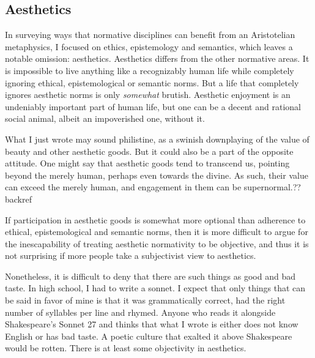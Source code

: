 \subsection{Aesthetics}
In surveying ways that normative disciplines can benefit from an Aristotelian metaphysics, I focused on 
ethics, epistemology  and semantics, which leaves a notable omission: aesthetics. Aesthetics differs from
the other normative areas. It is impossible to live anything like a recognizably human 
life while completely ignoring ethical, epistemological or semantic norms. But a life that completely ignores 
aesthetic norms is only \textit{somewhat} brutish. Aesthetic enjoyment is an undeniably important part of 
human life, but one can be a decent and rational social animal, albeit an impoverished one, without it. 

What I just wrote may sound philistine, as a swinish downplaying of the value of beauty and other aesthetic
goods. But it could also be a part of the opposite attitude. One might say that aesthetic goods tend to 
transcend us, pointing beyond the merely human, perhaps even towards the divine. As such, their value can
exceed the merely human, and engagement in them can be supernormal.??backref

If participation in aesthetic goods is somewhat more optional than adherence to ethical, epistemological
and semantic norms, then it is more difficult to argue for the inescapability of treating aesthetic normativity
to be objective, and thus it is not surprising if more people take a subjectivist view to aesthetics.

Nonetheless, it is difficult to deny that there are such things as good and bad taste. In high school, I had
to write a sonnet. I expect that only things that can be said in favor of mine is that it was grammatically
correct, had the right number of syllables per line and rhymed. Anyone who reads it alongside Shakespeare's 
Sonnet 27 and thinks that what I wrote is either does not know English or has bad taste. A poetic culture 
that exalted it above Shakespeare would be rotten.  There is at least some objectivity in aesthetics.

